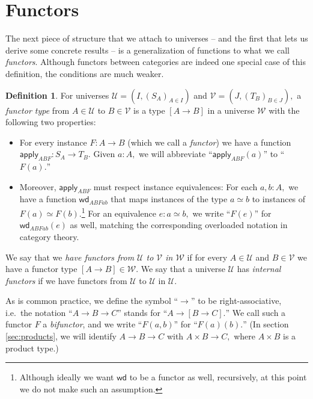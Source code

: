 \documentclass[a4paper]{article}
\theoremstyle{definition}
\newtheorem{definition}{Definition}[section]
\theoremstyle{remark}
\newcommand{\defn}{\emph}
\renewcommand{\equiv}{\simeq}
\newcommand{\U}{\mathcal{U}}
\newcommand{\V}{\mathcal{V}}
\newcommand{\W}{\mathcal{W}}
\newcommand{\nm}{\mathsf}
\newcommand{\apply}{\nm{apply}}
\newcommand{\congrArg}{\nm{wd}}
\begin{document}
\section{Functors}
\label{sec:functors}

The next piece of structure that we attach to universes -- and the first that lets us derive
some concrete results -- is a generalization of functions to what we call \defn{functors}.
Although functors between categories are indeed one special case of this definition, the
conditions are much weaker.

\begin{definition}
  For universes $\U = (I, (S_A)_{A \in I})$ and $\V = (J, (T_B)_{B \in J}),$ a
  \defn{functor type} from $A \in \U$ to $B \in \V$ is a type $[A \to B]$ in a universe $\W$
  with the following two properties:
  \begin{itemize}
    \item For every instance $F : A \to B$ (which we call a \defn{functor}) we have a
    function $\apply_{ABF} : S_A \to T_B.$ Given $a : A,$ we will abbreviate
    ``$\apply_{ABF}(a)$'' to ``$F(a).$''
    \item Moreover, $\apply_{ABF}$ must respect instance equivalences: For each
    $a,b : A,$ we have a function $\congrArg_{ABFab}$ that maps instances of the type
    $a \equiv b$ to instances of $F(a) \equiv F(b).$\footnote{Although ideally we want
    $\congrArg$ to be a functor as well, recursively, at this point we do not make such an
    assumption.}
    For an equivalence $e : a \equiv b,$ we write ``$F(e)$'' for $\congrArg_{ABFab}(e)$ as
    well, matching the corresponding overloaded notation in category theory.
  \end{itemize}
  
  We say that we \defn{have functors from $\U$ to $\V$ in $\W$} if for every $A \in \U$ and
  $B \in \V$ we have a functor type $[A \to B] \in \W.$
  We say that a universe $\U$ has \defn{internal functors} if we have functors from $\U$ to
  $\U$ in $\U.$

  As is common practice, we define the symbol ``$\to$'' to be right-associative, i.e.\ the
  notation ``$A \to B \to C$'' stands for ``$A \to [B \to C].$'' We call such a functor $F$ a
  \defn{bifunctor}, and we write ``$F(a,b)$'' for ``$F(a)(b).$'' (In section \ref{sec:products},
  we will identify $A \to B \to C$ with $A \times B \to C,$ where $A \times B$ is a product
  type.)
\end{definition}
\end{document}
